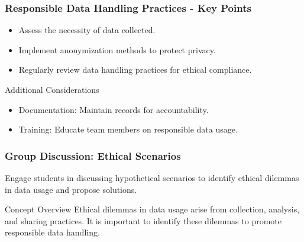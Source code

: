 \documentclass[aspectratio=169]{beamer}
\begin{document}
\begin{frame}[fragile]
    \frametitle{Responsible Data Handling Practices - Key Points}
    \begin{itemize}
        \item Assess the necessity of data collected.
        \item Implement anonymization methods to protect privacy.
        \item Regularly review data handling practices for ethical compliance.
    \end{itemize}
    \begin{block}{Additional Considerations}
        \begin{itemize}
            \item Documentation: Maintain records for accountability.
            \item Training: Educate team members on responsible data usage.
        \end{itemize}
    \end{block}
\end{frame}

\begin{frame}[fragile]
    \frametitle{Group Discussion: Ethical Scenarios}
    Engage students in discussing hypothetical scenarios to identify ethical dilemmas in data usage and propose solutions.

    \begin{block}{Concept Overview}
        Ethical dilemmas in data usage arise from collection, analysis, and sharing practices. It is important to identify these dilemmas to promote responsible data handling. 
    \end{block}
\end{frame}
\end{document}
